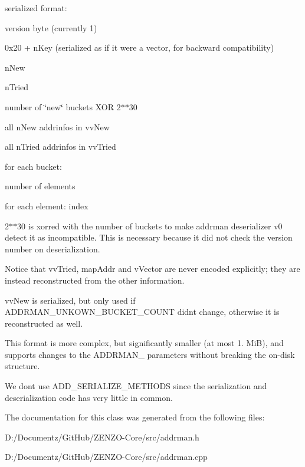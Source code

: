 serialized format\+:
\begin{DoxyItemize}
\item version byte (currently 1)
\item 0x20 + n\+Key (serialized as if it were a vector, for backward compatibility)
\item n\+New
\item n\+Tried
\item number of \char`\"{}new\char`\"{} buckets X\+OR 2$\ast$$\ast$30
\item all n\+New addrinfos in vv\+New
\item all n\+Tried addrinfos in vv\+Tried
\item for each bucket\+:
\begin{DoxyItemize}
\item number of elements
\item for each element\+: index
\end{DoxyItemize}
\end{DoxyItemize}

2$\ast$$\ast$30 is xorred with the number of buckets to make addrman deserializer v0 detect it as incompatible. This is necessary because it did not check the version number on deserialization.

Notice that vv\+Tried, map\+Addr and v\+Vector are never encoded explicitly; they are instead reconstructed from the other information.

vv\+New is serialized, but only used if A\+D\+D\+R\+M\+A\+N\+\_\+\+U\+N\+K\+O\+W\+N\+\_\+\+B\+U\+C\+K\+E\+T\+\_\+\+C\+O\+U\+NT didn\textquotesingle{}t change, otherwise it is reconstructed as well.

This format is more complex, but significantly smaller (at most 1. MiB), and supports changes to the A\+D\+D\+R\+M\+A\+N\+\_\+ parameters without breaking the on-\/disk structure.

We don\textquotesingle{}t use A\+D\+D\+\_\+\+S\+E\+R\+I\+A\+L\+I\+Z\+E\+\_\+\+M\+E\+T\+H\+O\+DS since the serialization and deserialization code has very little in common. 

The documentation for this class was generated from the following files\+:\begin{DoxyCompactItemize}
\item 
D\+:/\+Documentz/\+Git\+Hub/\+Z\+E\+N\+Z\+O-\/\+Core/src/addrman.\+h\item 
D\+:/\+Documentz/\+Git\+Hub/\+Z\+E\+N\+Z\+O-\/\+Core/src/addrman.\+cpp\end{DoxyCompactItemize}
